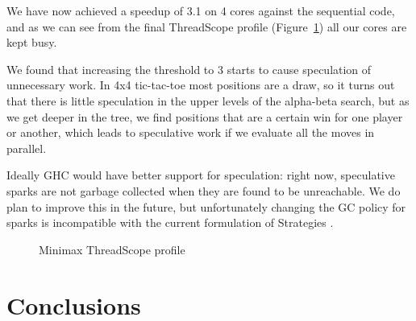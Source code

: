 \documentclass[twocolumn,9pt]{sigplanconf}
\let\cite=\citep
\begin{document}
We have now achieved a speedup of 3.1 on 4 cores against the
sequential code, and as we can see from the final ThreadScope profile
(Figure~\ref{f:minimax-threadscope3}) all our cores are kept busy.

We found that increasing the threshold to 3 starts to cause
speculation of unnecessary work.  In 4x4 tic-tac-toe most positions
are a draw, so it turns out that there is little speculation in the
upper levels of the alpha-beta search, but as we get deeper in the
tree, we find positions that are a certain win for one player or
another, which leads to speculative work if we evaluate all the moves
in parallel.  

Ideally GHC would have better support for speculation: right now,
speculative sparks are not garbage collected when they are found to be
unreachable.  We do plan to improve this in the future, but
unfortunately changing the GC policy for sparks is incompatible with
the current formulation of Strategies \cite{multicore-ghc}.

\begin{figure}
\caption{Minimax ThreadScope profile}
\label{f:minimax-threadscope3}
\end{figure}



\section{Conclusions}

{\small


}
\end{document}
